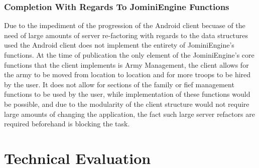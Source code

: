 \documentclass{article}
\begin{document}
\subsubsection{Completion With Regards To JominiEngine Functions}
Due to the impediment of the progression of the Android client becuase of the need of large amounts of server re-factoring with regards to the data structures used the Android client does not implement the entirety of JominiEngine's functions. At the time of publication the only element of the JominiEngine's core functions that the client implements is Army Management, the client allows for the army to be moved from location to location and for more troops to be hired by the user. It does not allow for sections of the family or fief management functions to be used by the user, while implementation of these functions would be possible, and due to the modularity of the client structure would not require large amounts of changing the application, the fact such large server refactors are required beforehand is blocking the task.
\newpage
\section{Technical Evaluation}
\end{document}
